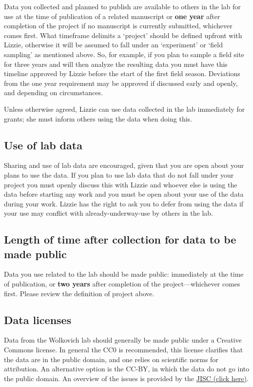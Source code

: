 \documentclass[11pt,a4paper,oneside]{article}
\begin{document}
Data you collected and planned to publish are available to others in the lab for use at the time of publication of a related manuscript or  {\bf one year} after completion of the project if no manuscript is currently submitted, whichever comes first. What timeframe delimits a `project' should be defined upfront with Lizzie, otherwise it will be assumed to fall under an `experiment' or `field sampling' as mentioned above. So, for example, if you plan to sample a field site for three years and will then analyze the resulting data you must have this timeline approved by Lizzie before the start of the first field season. Deviations from the one year requirement may be approved if discussed early and openly, and depending on circumstances.

Unless otherwise agreed, Lizzie can use data collected in the lab immediately for grants; she must inform others using the data when doing this. 

\subsection{Use of lab data}
Sharing and use of lab data are encouraged, given that you are open about your plans to use the data. If you plan to use lab data that do not fall under your project you must openly discuss this with Lizzie and whoever else is using the data before starting any work and you must be open about your use of the data during your work. Lizzie has the right to ask you to defer from using the data if your use may conflict with already-underway-use by others in the lab.

\subsection{Length of time after collection for data to be made public}
Data you use related to the lab should be made public: immediately at the time of publication, or {\bf two years} after completion of the project---whichever comes first. Please review the definition of project above. 
	
\subsection{Data licenses}
Data from the Wolkovich lab should generally be made public under a Creative Commons license. In general the CC0 is recommended, this license clarifies that the data are in the public domain, and one relies on scientific norms for attribution.  An alternative option is the CC-BY, in which the data do not go into the public domain. An overview of the issues is provided by the \href{http://discovery.ac.uk/files/pdf/Licensing_Open_Data_A_Practical_Guide.pdf}{JISC (click here)}. 
\end{document}
